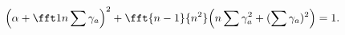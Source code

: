 \begin{equation}
\Bigl(\alpha+\fft1n\sum\gamma_a\Bigr)^2
+\fft{n-1}{n^2}\Bigl(n\sum\gamma_a^2+(\sum\gamma_a)^2\Bigr)=1.
\end{equation}

